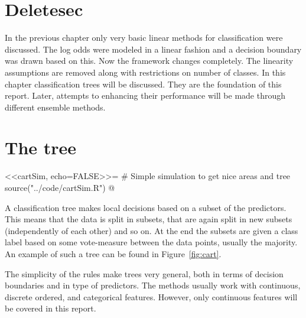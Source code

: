 \section{Deletesec}
In the previous chapter only very basic linear methods for classification were discussed. The log odds were modeled in a linear fashion and a decision boundary was drawn based on this. Now the framework changes completely. The linearity assumptions are removed along with restrictions on number of classes. 
In this chapter classification trees will be discussed. They are the foundation of this report. Later, attempts to enhancing their performance will be made through different ensemble methods. 

\section{The tree}
\label{sec:Tree}
<<cartSim, echo=FALSE>>=
# Simple simulation to get nice areas and tree
source("../code/cartSim.R")
@

A classification tree makes local decisions based on a subset of the predictors. This means that the data is split in subsets, that are again split in new subsets (independently of each other) and so on. 
At the end the subsets are given a class label based on some vote-measure between the data points, usually the majority.
An example of such a tree can be found in Figure~\ref{fig:cart}.

The simplicity of the rules make trees very general, both in terms of decision boundaries and in type of predictors. The methods usually work with continuous, discrete ordered, and categorical features. However, only continuous features will be covered in this report.  

